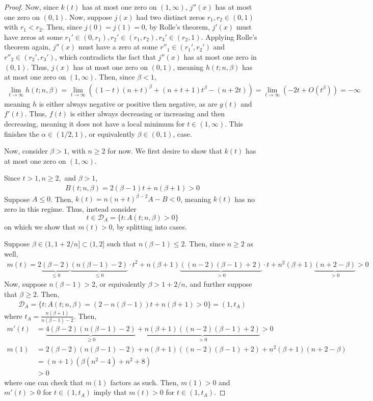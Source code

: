 \documentclass[11pt]{article}
\begin{document}
\begin{proof}
Now, since $k(t)$ has at most one zero on $(1,\infty)$, $j''(x)$ has at most one zero on $(0,1)$. Now, suppose $j(x)$ had two distinct zeros $r_1,r_2\in (0,1)$ with $r_1<r_2$. Then, since $j(0)=j(1)=0$, by Rolle's theorem, $j'(x)$ must have zeros at some $r_1'\in (0,r_1),r_2'\in (r_1,r_2),r_3'\in (r_2,1)$. Applying Rolle's theorem again, $j''(x)$ must have a zero at some $r''_1\in (r_1',r_2')$ and $r''_2\in (r_2',r_3')$, which contradicts the fact that $j''(x)$ has at most one zero in $(0,1)$. Thus, $j(x)$ has at most one zero on $(0,1)$, meaning $h(t;n,\beta)$ has at most one zero on $(1,\infty)$. Then, since $\beta <1$, 
\begin{align*}
    \lim_{t\to \infty}h(t;n,\beta)=\lim_{t\to\infty}((1-t)(n+t)^\beta+(n+t+1)t^\beta -(n+2t))=\lim_{t\to \infty}(-2t+O(t^\beta))=-\infty
\end{align*}
meaning $h$ is either always negative or positive then negative, as are $g(t)$ and $f'(t)$. Thus, $f(t)$ is either always decreasing or increasing and then decreasing, meaning it does not have a local minimum for $t\in (1,\infty)$. This finishes the $\alpha\in (1/2,1)$, or equivalently $\beta \in (0,1)$, case. 

Now, consider $\beta > 1$, with $n\geq 2$ for now. We first desire to show that $k(t)$ has at most one zero on $(1,\infty)$. 


Since $t>1, n\geq 2, $ and $\beta >1$, 
\begin{align*}
   B(t;n,\beta)=2(\beta-1)t+n(\beta+1)>0 
\end{align*}
Suppose $A\leq 0$. Then, $k(t)=n(n+t)^{\beta-2}A-B<0$, meaning $k(t)$ has no zero in this regime. Thus, instead consider
$$t \in \mathcal{D}_A=\{t:A(t;n,\beta)>0\}$$
on which we show that $m(t)>0$, by splitting into cases. 

Suppose $\beta\in (1,1+2/n]\subset (1,2] $ such that $n(\beta-1)\leq 2$. Then, since $n\geq 2$ as well,
\begin{align*}
    m(t)=2\underbrace{(\beta-2)}_{\leq 0}\underbrace{(n(\beta-1)-2)}_{\leq 0}\cdot t^2 +n(\beta+1)\underbrace{((n-2)(\beta-1)+2)}_{>0}\cdot t+n^2(\beta+1)\underbrace{(n+2-\beta)}_{>0}>0
\end{align*}
Now, suppose $n(\beta-1)> 2$, or equivalently $\beta >1+2/n$, and further suppose that $\beta \geq 2$. Then, 
\begin{align*}
    \mathcal{D}_A=\{t:A(t;n,\beta)=(2-n(\beta-1))t+n(\beta+1)>0\}=(1,t_A)
\end{align*}
where $t_A=\frac{n(\beta+1)}{n(\beta-1)-2}$. Then,
\begin{align*}
    m'(t)&=\underbrace{4(\beta-2)(n(\beta-1)-2)}_{\geq 0}+\underbrace{n(\beta+1)((n-2)(\beta-1)+2)}_{>0}>0\\
    m(1)&=2(\beta-2)(n(\beta-1)-2)+n(\beta+1)((n-2)(\beta-1)+2)+n^2(\beta+1)(n+2-\beta)\\
    &=(n+1)(\beta(n^2-4)+n^2+8)\\
    &>0
\end{align*}
where one can check that $m(1)$ factors as such. Then, $m(1)>0$ and $m'(t)>0$ for $t\in(1,t_A)$ imply that $m(t)>0$ for $t\in (1,t_A)$. 


\end{proof}
\end{document}
